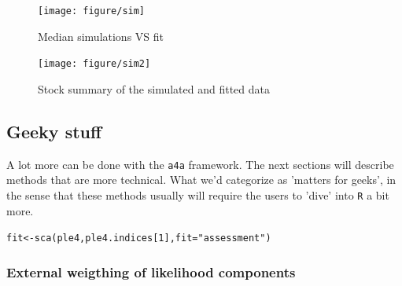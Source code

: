 \documentclass[a4paper,english,10pt]{article}\usepackage[]{graphicx}\usepackage[]{color}
\makeatletter
\newcommand{\hlnum}[1]{\textcolor[rgb]{0.2,0.2,0.2}{#1}}%
\newcommand{\hlstr}[1]{\textcolor[rgb]{0.2,0.2,0.2}{#1}}%
\newcommand{\hlstd}[1]{\textcolor[rgb]{0,0,0}{#1}}%
\newcommand{\hlkwb}[1]{\textcolor[rgb]{0.361,0.506,0.596}{#1}}%
\newcommand{\hlkwc}[1]{\textcolor[rgb]{0.361,0.506,0.596}{#1}}%
\newcommand{\hlkwd}[1]{\textcolor[rgb]{0.361,0.506,0.596}{#1}}%
\newenvironment{kframe}{%
 \def\at@end@of@kframe{}%
 \ifinner\ifhmode%
  \def\at@end@of@kframe{\end{minipage}}%
  \begin{minipage}{\columnwidth}%
 \fi\fi%
 \def\FrameCommand##1{\hskip\@totalleftmargin \hskip-\fboxsep
 \colorbox{shadecolor}{##1}\hskip-\fboxsep
     \hskip-\linewidth \hskip-\@totalleftmargin \hskip\columnwidth}%
 \MakeFramed {\advance\hsize-\width
   \@totalleftmargin\z@ \linewidth\hsize
   \@setminipage}}%
 {\par\unskip\endMakeFramed%
 \at@end@of@kframe}
\newenvironment{knitrout}{}{} %
\newcommand{\initiative}[1]{{\texttt{#1}}}
\newcommand{\pkg}[1]{{\texttt{#1}}}
\makeatother
\begin{document}
\begin{knitrout}
\color{fgcolor}\begin{figure}[H]


{\centering \texttt{[image: figure/sim]} 

}

\caption[Median simulations VS fit]{Median simulations VS fit\label{fig:sim}}
\end{figure}


\end{knitrout}

\begin{knitrout}
\color{fgcolor}\begin{figure}[H]


{\centering \texttt{[image: figure/sim2]} 

}

\caption[Stock summary of the simulated and fitted data]{Stock summary of the simulated and fitted data\label{fig:sim2}}
\end{figure}


\end{knitrout}

\subsection{Geeky stuff}

A lot more can be done with the \initiative{a4a} framework. The next sections will describe methods that are more technical. What we'd categorize as 'matters for geeks', in the sense that these methods usually will require the users to 'dive' into \pkg{R} a bit more. 

\begin{knitrout}
\color{fgcolor}\begin{kframe}
\begin{alltt}
\hlstd{fit} \hlkwb{<-} \hlkwd{sca}\hlstd{(ple4, ple4.indices[}\hlnum{1}\hlstd{],} \hlkwc{fit}\hlstd{=}\hlstr{"assessment"}\hlstd{)}
\end{alltt}
\end{kframe}
\end{knitrout}

\subsubsection{External weigthing of likelihood components}
\end{document}
